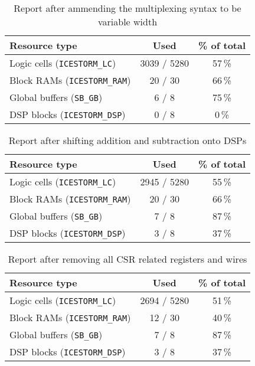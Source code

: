 \documentclass[a4paper,10pt]{article}
\begin{document}
\begin{table}[H] 
    \centering
    \begin{tabularx}{0.65\textwidth}{X c c}
        \toprule
        Resource type & Used & \% of total \\ \midrule
        Logic cells (\texttt{ICESTORM\_LC}) & 3039 / 5280 & 57\,\% \\
        Block RAMs (\texttt{ICESTORM\_RAM}) & 20 / 30 & 66\,\% \\
        Global buffers (\texttt{SB\_GB}) & 6 / 8 & 75\,\% \\
        DSP blocks (\texttt{ICESTORM\_DSP}) & 0 / 8 & 0\,\% \\
        \bottomrule
    \end{tabularx}
    \caption{Report after ammending the multiplexing syntax to be variable width}
    \label{tab:Mux}
\end{table}

\begin{table}[H] 
    \centering
    \begin{tabularx}{0.65\textwidth}{X c c}
        \toprule
        Resource type & Used & \% of total \\ \midrule
        Logic cells (\texttt{ICESTORM\_LC}) & 2945 / 5280 & 55\,\% \\
        Block RAMs (\texttt{ICESTORM\_RAM}) & 20 / 30 & 66\,\% \\
        Global buffers (\texttt{SB\_GB}) & 7 / 8 & 87\,\% \\
        DSP blocks (\texttt{ICESTORM\_DSP}) & 3 / 8 & 37\,\% \\
        \bottomrule
    \end{tabularx}
    \caption{Report after shifting addition and subtraction onto DSPs}
    \label{tab:DSP}
\end{table}

\begin{table}[H] 
    \centering
    \begin{tabularx}{0.65\textwidth}{X c c}
        \toprule
        Resource type & Used & \% of total \\ \midrule
        Logic cells (\texttt{ICESTORM\_LC}) & 2694 / 5280 & 51\,\% \\
        Block RAMs (\texttt{ICESTORM\_RAM}) & 12 / 30 & 40\,\% \\
        Global buffers (\texttt{SB\_GB}) & 7 / 8 & 87\,\% \\
        DSP blocks (\texttt{ICESTORM\_DSP}) & 3 / 8 & 37\,\% \\
        \bottomrule
    \end{tabularx}
    \caption{Report after removing all CSR related registers and wires}
    \label{tab:CSR}
\end{table}
\end{document}
